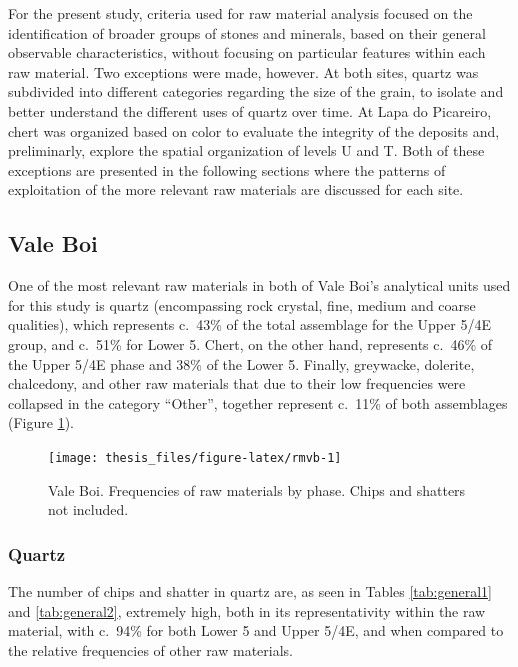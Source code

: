 \documentclass[12pt,twoside]{reedthesis}
\begin{document}
For the present study, criteria used for raw material analysis focused on the identification of broader groups of stones and minerals, based on their general observable characteristics, without focusing on particular features within each raw material. Two exceptions were made, however. At both sites, quartz was subdivided into different categories regarding the size of the grain, to isolate and better understand the different uses of quartz over time. At Lapa do Picareiro, chert was organized based on color to evaluate the integrity of the deposits and, preliminarly, explore the spatial organization of levels U and T. Both of these exceptions are presented in the following sections where the patterns of exploitation of the more relevant raw materials are discussed for each site.

\hypertarget{vale-boi-3}{%
\subsection{Vale Boi}\label{vale-boi-3}}

One of the most relevant raw materials in both of Vale Boi's analytical units used for this study is quartz (encompassing rock crystal, fine, medium and coarse qualities), which represents c.~43\% of the total assemblage for the Upper 5/4E group, and c.~51\% for Lower 5. Chert, on the other hand, represents c.~46\% of the Upper 5/4E phase and 38\% of the Lower 5. Finally, greywacke, dolerite, chalcedony, and other raw materials that due to their low frequencies were collapsed in the category ``Other'', together represent c.~11\% of both assemblages (Figure \ref{fig:rmvb}).
\begin{figure}

{\centering \texttt{[image: thesis\_files/figure-latex/rmvb-1]} 

}

\caption{Vale Boi. Frequencies of raw materials by phase. Chips and shatters not included.}\label{fig:rmvb}
\end{figure}
\hypertarget{quartz}{%
\subsubsection{Quartz}\label{quartz}}

The number of chips and shatter in quartz are, as seen in Tables \ref{tab:general1} and \ref{tab:general2}, extremely high, both in its representativity within the raw material, with c.~94\% for both Lower 5 and Upper 5/4E, and when compared to the relative frequencies of other raw materials.
\end{document}
